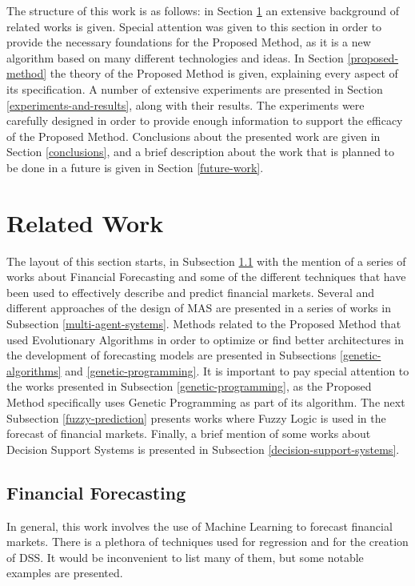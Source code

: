 \documentclass[12pt,journal,draftcls,onecolumn]{IEEEtran}
\begin{document}
The structure of this work is as follows: in Section \ref{related-work} an extensive background of related works is given. Special attention was given to this section in order to provide the necessary foundations for the Proposed Method, as it is a new algorithm based on many different technologies and ideas. In Section \ref{proposed-method} the theory of the Proposed Method is given, explaining every aspect of its specification. A number of extensive experiments are presented in Section \ref{experiments-and-results}, along with their results. The experiments were carefully designed in order to provide enough information to support the efficacy of the Proposed Method. Conclusions about the presented work are given in Section \ref{conclusions}, and a brief description about the work that is planned to be done in a future is given in Section \ref{future-work}.
  

\section{Related Work}
\label{related-work}

The layout of this section starts, in Subsection \ref{financial-forecasting} with the mention of a series of works about Financial Forecasting and some of the different techniques that have been used to effectively describe and predict financial markets. Several and different approaches of the design of MAS are presented in a series of works in Subsection \ref{multi-agent-systems}. Methods related to the Proposed Method that used Evolutionary Algorithms in order to optimize or find better architectures in the development of forecasting models are presented in Subsections \ref{genetic-algorithms} and \ref{genetic-programming}. It is important to pay special attention to the works presented in Subsection \ref{genetic-programming}, as the Proposed Method specifically uses Genetic Programming as part of its algorithm. The next Subsection \ref{fuzzy-prediction} presents works where Fuzzy Logic is used in the forecast of financial markets. Finally, a brief mention of some works about Decision Support Systems is presented in Subsection \ref{decision-support-systems}.

\subsection{Financial Forecasting}
\label{financial-forecasting}

In general, this work involves the use of Machine Learning to forecast financial markets. There is a plethora of techniques used for regression and for the creation of DSS. It would be inconvenient to list many of them, but some notable examples are presented.
\end{document}
